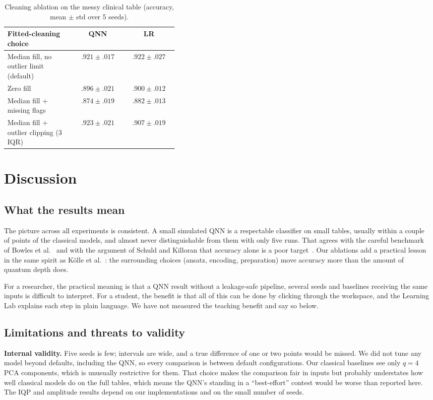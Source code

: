 \documentclass[conference]{IEEEtran}
\begin{document}
\begin{table}[!t]
\caption{Cleaning ablation on the messy clinical table (accuracy, mean $\pm$ std over 5 seeds).}
\label{tab:clean}
\centering\footnotesize
\begin{tabular}{p{0.40\linewidth}cc}
\toprule
Fitted-cleaning choice & QNN & LR\\
\midrule
Median fill, no outlier limit (default) & $.921\pm.017$ & $.922\pm.027$\\
Zero fill & $.896\pm.021$ & $.900\pm.012$\\
Median fill + missing flags & $.874\pm.019$ & $.882\pm.013$\\
Median fill + outlier clipping (3 IQR) & $\mathbf{.923}\pm.021$ & $.907\pm.019$\\
\bottomrule
\end{tabular}
\end{table}

\section{Discussion}
\subsection{What the results mean}
The picture across all experiments is consistent. A small simulated QNN is a respectable classifier on small tables, usually within a couple of points of the classical models, and almost never distinguishable from them with only five runs. That agrees with the careful benchmark of Bowles et al.~\cite{bowles2024better} and with the argument of Schuld and Killoran that accuracy alone is a poor target~\cite{schuld2022advantage}. Our ablations add a practical lesson in the same spirit as K\"olle et al.~\cite{kolle2023disentangling}: the surrounding choices (ansatz, encoding, preparation) move accuracy more than the amount of quantum depth does.

For a researcher, the practical meaning is that a QNN result without a leakage-safe pipeline, several seeds and baselines receiving the same inputs is difficult to interpret. For a student, the benefit is that all of this can be done by clicking through the workspace, and the Learning Lab explains each step in plain language. We have not measured the teaching benefit and say so below.

\subsection{Limitations and threats to validity}
\textbf{Internal validity.} Five seeds is few; intervals are wide, and a true difference of one or two points would be missed. We did not tune any model beyond defaults, including the QNN, so every comparison is between default configurations. Our classical baselines see only $q=4$ PCA components, which is unusually restrictive for them. That choice makes the comparison fair in inputs but probably understates how well classical models do on the full tables, which means the QNN's standing in a ``best-effort'' contest would be worse than reported here. The IQP and amplitude results depend on our implementations and on the small number of seeds.
\end{document}
